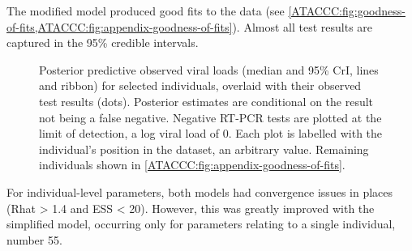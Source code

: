 \documentclass[thesis.tex]{subfiles}
\begin{document}
The modified model produced good fits to the data (see \cref{ATACCC:fig:goodness-of-fits,ATACCC:fig:appendix-goodness-of-fits}).
Almost all test results are captured in the 95\% credible intervals.
\begin{figure}
  \caption[Posterior predictive viral load fits]{Posterior predictive observed viral loads (median and 95\% CrI, lines and ribbon) for selected individuals, overlaid with their observed test results (dots). Posterior estimates are conditional on the result not being a false negative. Negative RT-PCR tests are plotted at the limit of detection, \ie a log viral load of 0. Each plot is labelled with the individual's position in the dataset, an arbitrary value.
  Remaining individuals shown in \cref{ATACCC:fig:appendix-goodness-of-fits}.
  \label{ATACCC:fig:goodness-of-fits}}
\end{figure}

For individual-level parameters, both models had convergence issues in places (Rhat > 1.4 and ESS < 20).
However, this was greatly improved with the simplified model, occurring only for parameters relating to a single individual, number 55.
\end{document}
